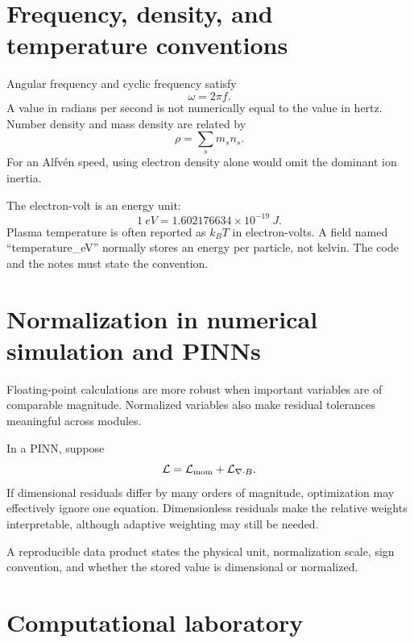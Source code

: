 \documentclass[11pt]{article}
\begin{document}
\section{Frequency, density, and temperature conventions}

Angular frequency and cyclic frequency satisfy
\begin{equation}
\omega=2\pi f.
\end{equation}
A value in radians per second is not numerically equal to the value in hertz. Number density and mass density are related by
\begin{equation}
\rho=\sum_s m_sn_s.
\end{equation}
For an Alfv\'en speed, using electron density alone would omit the dominant ion inertia.

The electron-volt is an energy unit:
\begin{equation}
1\ \si{eV}=1.602176634\times10^{-19}\ \si{J}.
\end{equation}
Plasma temperature is often reported as $k_BT$ in electron-volts. A field named ``temperature\_eV'' normally stores an energy per particle, not kelvin. The code and the notes must state the convention.


\section{Normalization in numerical simulation and PINNs}

Floating-point calculations are more robust when important variables are of comparable magnitude. Normalized variables also make residual tolerances meaningful across modules.

In a PINN, suppose
\begin{equation}
\mathcal L=\mathcal L_{\rm mom}+\mathcal L_{\nabla\cdot B}.
\end{equation}
If dimensional residuals differ by many orders of magnitude, optimization may effectively ignore one equation. Dimensionless residuals make the relative weights interpretable, although adaptive weighting may still be needed.

\begin{physicsbox}
A reproducible data product states the physical unit, normalization scale, sign convention, and whether the stored value is dimensional or normalized.
\end{physicsbox}


\section{Computational laboratory}
\end{document}
